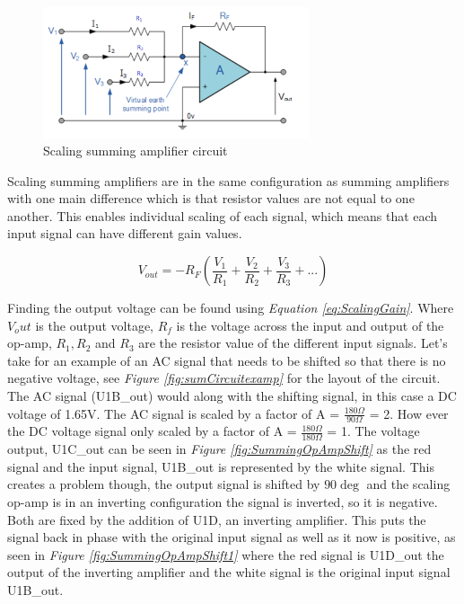 \begin{figure}[h]
    \centering
    \includegraphics[width=0.70\textwidth]{graphics/SummingOpAmp.png}
    \caption{Scaling summing amplifier circuit \cite{noauthor_summing_2013}}
    \label{fig:SummingOpAmp}
\end{figure}

Scaling summing amplifiers are in the same configuration as summing amplifiers with one main difference which is that resistor values are not equal to one another.
This enables individual scaling of each signal, which means that each input signal can have different gain values.


\begin{equation}
    V_{out} = -R_F(\frac{V_1}{R_{1}} +\frac{V_2}{R_{2}} +\frac{V_3}{R_{3}} + ...)
    \label{eq:ScalingGain}
\end{equation}

Finding the output voltage can be found using \textit{Equation \ref{eq:ScalingGain}}.
Where $V_out$ is the output voltage, $R_f$ is the voltage across the input and output of the op-amp, $R_1, R_2$ and $R_3$ are the resistor value of the different input signals.
Let's take for an example of an AC signal that needs to be shifted so that there is no negative voltage, see \textit{Figure \ref{fig:sumCircuitexamp}} for the layout of the circuit.
The AC signal (U1B\_out) would along with the shifting signal, in this case a DC voltage of 1.65V.
The AC signal is scaled by a factor of A = $\frac{180\Omega}{90\Omega}$ = 2.
How ever the DC voltage signal only scaled by a factor of A = $\frac{180\Omega}{180\Omega}$ = 1.
The voltage output, U1C\_out can be seen in \textit{Figure \ref{fig:SummingOpAmpShift}} as the red signal and the input signal, U1B\_out is represented by the white signal.
This creates a problem though, the output signal is shifted by $90\deg$ and the scaling op-amp is in an inverting configuration the signal is inverted, so it is negative.
Both are fixed by the addition of U1D, an inverting amplifier.
This puts the signal back in phase with the original input signal as well as it now is positive, as seen in \textit{Figure \ref{fig:SummingOpAmpShift1}} where the red signal is U1D\_out the output of the inverting amplifier and the white signal is the original input signal U1B\_out.


